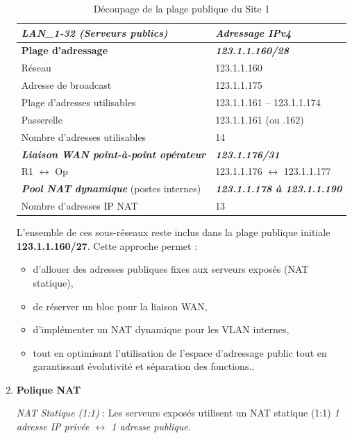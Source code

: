 \documentclass[12pt,a4paper, oneside]{memoir}
\begin{document}
\begin{enumerate}
\begin{table}[H]
	\centering
	\renewcommand{\arraystretch}{1.3}
	\begin{tabular}{|l|l|}
		\hline
		\rowcolor{gray!10}
		\textbf{\textit{LAN\_1-32 (Serveurs publics)}} & \textbf{\textit{Adressage IPv4}}\\
		\hline
		\textbf{Plage d'adressage} & \textbf{\textit{123.1.1.160/28}} \\
		\hline
		Réseau & 123.1.1.160 \\
		\hline
		Adresse de broadcast & 123.1.1.175 \\
		\hline
		Plage d'adresses utilisables & 123.1.1.161 -- 123.1.1.174 \\
		\hline
		Passerelle  & 123.1.1.161 (ou .162)\\
		\hline
		Nombre d'adresses utilisables & 14 \\
		\hline	
		\hline
		\textbf{\textit{Liaison WAN point-à-point opérateur}} & \textbf{\textit{123.1.176/31}}\\
		\hline
		R1 $\leftrightarrow$ Op & 123.1.1.176 $\leftrightarrow$ 123.1.1.177\\
		\hline
		\hline
		\textbf{\textit{Pool NAT dynamique}} (postes internes) & \textbf{\textit{123.1.1.178 à 123.1.1.190}} \\
		\hline
		Nombre d'adresses IP NAT & 13\\
		\hline
	\end{tabular}
	\caption{Découpage de la plage publique du Site 1}
\end{table}

L’ensemble de ces sous-réseaux reste inclus dans la plage publique initiale 
\textbf{123.1.1.160/27}. Cette approche permet :

\begin{itemize}
	\item d’allouer des adresses publiques fixes aux serveurs exposés (NAT statique),
	\item de réserver un bloc pour la liaison WAN,
	\item d’implémenter un NAT dynamique pour les VLAN internes,
	\item tout en optimisant l’utilisation de l’espace d’adressage public tout en garantissant évolutivité et séparation des fonctions..
\end{itemize}

\vspace{0.5cm}
\item \textbf{Polique NAT }

\textit{NAT Statique (1:1)} : Les serveurs exposés utilisent un NAT statique (1:1) \textit{1 adresse IP privée $\leftrightarrow$ 1 adresse publique}.


\end{enumerate}
\end{document}
